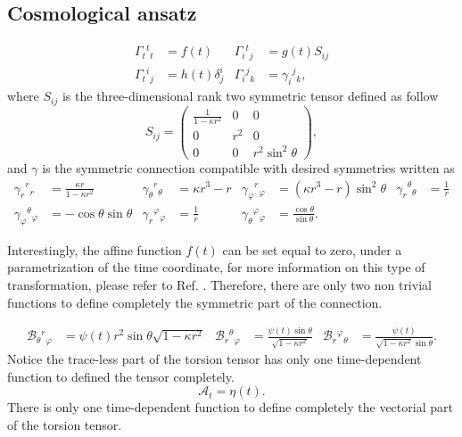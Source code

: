 \documentclass{article}
\providecommand{\ctG}[3]{\Gamma_{#1}{}^{ #2}{}_{#3}}
\providecommand{\ctg}[3]{\gamma_{#1}{}^{ #2}{}_{#3}}
\providecommand{\B}[3]{\mathcal{B}_{#1}{}^{ #2}{}_{#3}}
\providecommand{\A}[1]{\mathcal{A}_{#1}}
\begin{document}
\subsection{Cosmological ansatz}

\begin{align}
    \label{G_ansatz}
    \ctG{t}{t}{t} & =f(t) & \ctG{i}{t}{j} & = g(t) S_{i j} \\
    \ctG{t}{i}{j} &= h(t) \delta^{i}_{j} & \ctG{i}{j}{k} & = \ctg{i}{j}{k},
\end{align}
where $S_{ij}$ is the three-dimensional rank two symmetric tensor defined as follow
\begin{equation}
    S_{i j}=\left(\begin{array}{ccc}
    \frac{1}{1-\kappa r^2} & 0 & 0 \\
    0 & r^2 & 0 \\
    0 & 0 & r^2 \sin ^2 \theta
    \end{array}\right),
\end{equation}
and $\gamma$ is the symmetric connection compatible with desired symmetries written as
\begin{align}
    \ctg{r}{r}{r} & = \frac{\kappa r}{1 - \kappa r^2} & \ctg{\theta}{r}{\theta} & = \kappa r^3 - r &
    \ctg{\varphi}{r}{\varphi} & = \left(\kappa r^3 - r\right)\sin^2\theta & \ctg{r}{\theta}{\theta} & = \frac{1}{r} \\
    \ctg{\varphi}{\theta}{\varphi} & = -\cos\theta\sin\theta & \ctg{r}{\varphi}{\varphi} & = \frac{1}{r} & 
    \ctg{\theta}{\varphi}{\varphi} & = \frac{\cos \theta}{\sin \theta}.
\end{align}

Interestingly, the affine function $f(t)$ can be set equal to zero, under a parametrization of the time coordinate, for more information
on this type of transformation, please refer to Ref. \cite{Castillo_Felisola_2022_EPJC}. Therefore, there are only two non trivial functions
to define completely the symmetric part of the connection.

\begin{equation}
\label{B_ansatz}
\begin{aligned}
    \B{\theta}{r}{\varphi} & = \psi (t) r^2\sin\theta \sqrt{1 - \kappa r^2} &
    \B{r}{\theta}{\varphi} & =\frac{\psi (t) \sin \theta}{\sqrt{1 - \kappa r^2}} & 
    \B{r}{\varphi}{\theta} & =\frac{\psi(t)}{ \sqrt{1-\kappa r^{2}} \sin \theta}.
\end{aligned}
\end{equation}
Notice the trace-less part of the torsion tensor has only one time-dependent function to defined the tensor completely.
\begin{equation}
    \label{A_ansatz}
    \A{t} = \eta(t).
\end{equation}
There is only one time-dependent function to define completely the vectorial part of the torsion tensor.
\end{document}

